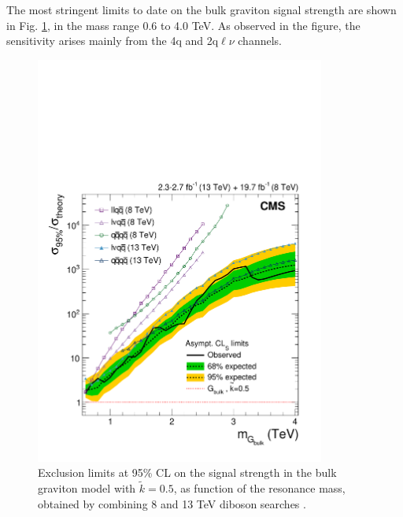 The most stringent limits to date on the bulk graviton signal strength are shown in Fig. \ref{latestLimits}, in the mass range 0.6 to 4.0 TeV. As observed in the figure, the sensitivity arises mainly from the 4q and 2q$\ell\nu$ channels.

\begin{figure}[htb!!]
\centering
\includegraphics[width=0.85\textwidth]{figures/theory/CMS-B2G-16-007_Figure_003.pdf}
\caption[Latest limits]{Exclusion limits at 95\% CL on the signal strength in the bulk graviton model with $\tilde{k}=0.5$, as function of the resonance mass, obtained by combining 8 and 13 TeV diboson searches \cite{Sirunyan:2017nrt}.}
\label{latestLimits}
\end{figure}
